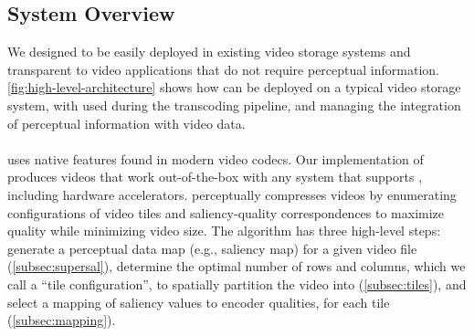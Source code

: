 
\subsection{\name System Overview}

We designed \name to be easily deployed in existing video storage systems and transparent to video applications that do not require perceptual information.
\ref{fig:high-level-architecture} shows how \name can be deployed on a typical video storage system, with \nameCompress used during the transcoding pipeline, and \nameStore managing the integration of perceptual information with video data.

\architectureOverviewFigure



\paragraph{\nameCompress} uses native features found in modern video codecs.
Our implementation of \nameCompress produces videos that work out-of-the-box with any system that supports \hevc, including hardware accelerators.
\nameCompress perceptually compresses videos by enumerating configurations of video tiles and saliency-quality correspondences to maximize quality while minimizing video size.
The algorithm has three high-level steps: generate a perceptual data map (e.g., saliency map) for a given video file (\ref{subsec:supersal}), determine the optimal number of rows and columns, which we call a ``tile configuration'', to spatially partition the video into (\ref{subsec:tiles}), and select a mapping of saliency values to encoder qualities, for each tile (\ref{subsec:mapping}).

